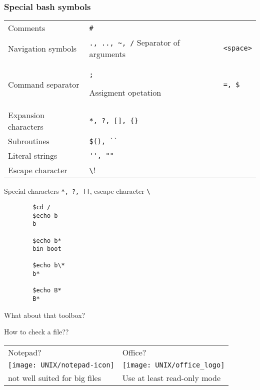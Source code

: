 \documentclass[xcolor=dvipsnames]{beamer}
\begin{document}
\begin{frame}[fragile]
	\frametitle{Special bash symbols}
	\large
	\begin{tabular}{L{0.5\textwidth} L{0.5\textwidth}}
	Comments & \verb!#! \\
	Navigation symbols & \verb!., .., ~, /!
	Separator of arguments & \verb!<space>! \\
	Command separator & \verb!;!

	Assigment opetation & \verb!=, $! \\
	Expansion characters & \verb!*, ?, [], {}! \\
	Subroutines & \verb!$(), ``! \\

	Literal strings & \verb!'', ""! \\
	Escape character & \verb!\!
	\end{tabular}
\end{frame}

\begin{frame}[fragile]
	\Large
	Special characters \verb!*, ?, []!, escape character \verb!\!
	\begin{verbatim}
		$cd /
		$echo b
		b

		$echo b*
		bin boot

		$echo b\*
		b*

		$echo B*
		B*

	\end{verbatim}
\end{frame}


\begin{frame}
	\Huge
	\begin{center}
		What about that toolbox?
	\end{center}
\end{frame}

\begin{frame}
	\begin{center}
	\huge
	How to check a file?? \\
	\vspace{1cm}

	\Large
	\begin{tabular}{C{0.4\textwidth}C{0.4\textwidth}}
	Notepad? & Office? \\
	\texttt{[image: UNIX/notepad-icon]} & \texttt{[image: UNIX/office\_logo]} \\
	\small not well suited for big files & \small Use at least read-only mode\\
	\end{tabular}
	\end{center}
\end{frame}
\end{document}
